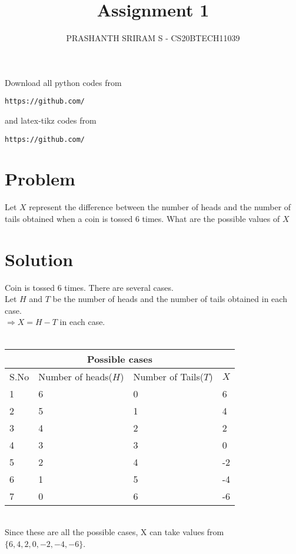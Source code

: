 \documentclass[journal,12pt,twocolumn]{IEEEtran}
\begin{document}
\title{Assignment 1}
\author{PRASHANTH SRIRAM S - CS20BTECH11039}
\maketitle
\newpage
\bigskip
\renewcommand{\thefigure}{\theenumi}
\renewcommand{\thetable}{\theenumi}
Download all python codes from 
\begin{lstlisting}
https://github.com/
\end{lstlisting}
%
and latex-tikz codes from 
%
\begin{lstlisting}
https://github.com/
\end{lstlisting}
\section{Problem}
Let $X$ represent the difference between the number of heads and the number of tails obtained when a coin is tossed 6 times. What are the possible values of $X$
\section{Solution} 
    Coin is tossed 6 times. There are several cases. \\
    Let $H$ and $T$ be the number of heads and the number of tails obtained in each case. \\
    $\Rightarrow X=H-T$ in each case.\\ \\
    \begin{tabular}{ |p{1.5cm}||p{1.5cm}|p{1.5cm}|p{1.5cm}|  }
 \hline
 \multicolumn{4}{|c|}{Possible cases} \\
 \hline
 S.No& Number of heads($H$)& Number of Tails($T$)&$X$\\
 \hline
 1   &6&0&6\\
 2&5&1&4\\
 3&4&2&2\\
 4&3&3&0\\
 5&2&4&-2\\
 6&1&5&-4\\
 7&0&6&-6\\
 \hline
\end{tabular} \\
Since these are all the possible cases, X can take values from $\{6,4,2,0,-2,-4,-6\}$.
\end{document}
